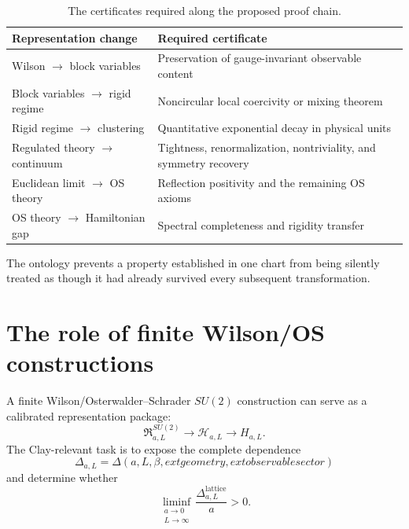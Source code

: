 \documentclass[11pt]{article}
\theoremstyle{remark}
\newcommand{\cH}{\mathcal{H}}
\begin{document}
\begin{table}[ht]
\centering
\small
\renewcommand{\arraystretch}{1.2}
\begin{tabularx}{\textwidth}{>{\raggedright\arraybackslash}p{}X}
\toprule
\textbf{Representation change} & \textbf{Required certificate} \\
\midrule
Wilson $\to$ block variables
  & Preservation of gauge-invariant observable content \\
Block variables $\to$ rigid regime
  & Noncircular local coercivity or mixing theorem \\
Rigid regime $\to$ clustering
  & Quantitative exponential decay in physical units \\
Regulated theory $\to$ continuum
  & Tightness, renormalization, nontriviality, and symmetry recovery \\
Euclidean limit $\to$ OS theory
  & Reflection positivity and the remaining OS axioms \\
OS theory $\to$ Hamiltonian gap
  & Spectral completeness and rigidity transfer \\
\bottomrule
\end{tabularx}
\caption{The certificates required along the proposed proof chain.}
\label{tab:certificates}
\end{table}

The ontology prevents a property established in one chart from being silently
treated as though it had already survived every subsequent transformation.

\section{The role of finite Wilson/OS constructions}

A finite Wilson/Osterwalder--Schrader $SU(2)$ construction can serve as a
calibrated representation package:
\begin{equation}
  \mathfrak R^{SU(2)}_{a,L}
  \longrightarrow
  \cH_{a,L}
  \longrightarrow
  H_{a,L}.
  \label{eq:finite-package}
\end{equation}
The Clay-relevant task is to expose the complete dependence
\begin{equation}
  \Delta_{a,L}
  =
  \Delta
  \left(
    a,L,\beta,	ext{geometry},	ext{observable sector}
  \right)
  \label{eq:gap-dependence}
\end{equation}
and determine whether
\begin{equation}
  \liminf_{\substack{a\to0\\L\to\infty}}
  \frac{\Delta^{\mathrm{lattice}}_{a,L}}{a}
  >0.
  \label{eq:physical-gap-limit}
\end{equation}
\end{document}
